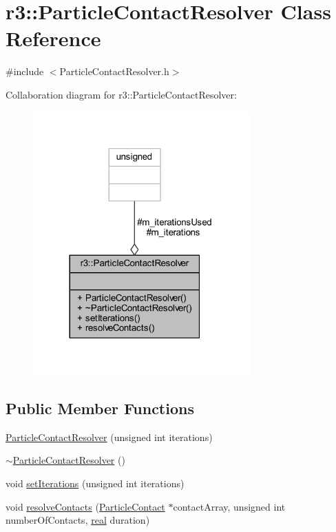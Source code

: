 \hypertarget{classr3_1_1_particle_contact_resolver}{}\section{r3\+:\+:Particle\+Contact\+Resolver Class Reference}
\label{classr3_1_1_particle_contact_resolver}


{\ttfamily \#include $<$Particle\+Contact\+Resolver.\+h$>$}



Collaboration diagram for r3\+:\+:Particle\+Contact\+Resolver\+:\nopagebreak
\begin{figure}[H]
\begin{center}
\leavevmode
\includegraphics[width=236pt]{classr3_1_1_particle_contact_resolver__coll__graph}
\end{center}
\end{figure}
\subsection*{Public Member Functions}
\begin{DoxyCompactItemize}
\item 
\mbox{\hyperlink{classr3_1_1_particle_contact_resolver_a37050bf25f0607a9290444121c56ee8f}{Particle\+Contact\+Resolver}} (unsigned int iterations)
\item 
\mbox{\hyperlink{classr3_1_1_particle_contact_resolver_ae7754eccf43c97727f1ecfac643cbd5b}{$\sim$\+Particle\+Contact\+Resolver}} ()
\item 
void \mbox{\hyperlink{classr3_1_1_particle_contact_resolver_ae82964d26967cb4a3bf73f0c360aa01e}{set\+Iterations}} (unsigned int iterations)
\item 
void \mbox{\hyperlink{classr3_1_1_particle_contact_resolver_a28fd96ffc247fc5f925674dd1757235e}{resolve\+Contacts}} (\mbox{\hyperlink{classr3_1_1_particle_contact}{Particle\+Contact}} $\ast$contact\+Array, unsigned int number\+Of\+Contacts, \mbox{\hyperlink{namespacer3_ab2016b3e3f743fb735afce242f0dc1eb}{real}} duration)
\end{DoxyCompactItemize}
